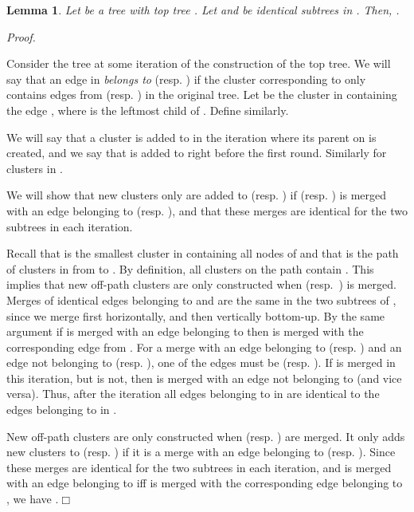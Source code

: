 \documentclass [11pt]{article}
\newtheorem{lemma}{Lemma}
\newcommand{\qed}{\hfill\ensuremath{\Box}\medskip\\\noindent}
\newenvironment{proof}{\noindent\emph{Proof. }}{}
\begin{document}
\begin{lemma}\label{lem:top-tree-ident}
Let  be a tree with top tree . Let  and  be identical subtrees in . Then, . 
\end{lemma}
\begin{proof} 


Consider the tree  at some iteration of the construction of the top tree. We will say that an edge  in  \emph{belongs to}  (resp. ) if the cluster corresponding to  only contains edges from  (resp. ) in the original tree. Let  be the cluster in   containing  the edge , where  is the leftmost child of . Define  similarly.

We will say that a cluster  is added to  in the iteration where its parent on  is created, and we say that  is added to  right before the first round. Similarly for clusters in .

We will show that new clusters only are added to  (resp. )  if  (resp. ) is merged with an edge belonging to  (resp. ), and that these merges are identical for the two subtrees in each iteration. 

Recall that  is the smallest cluster in  containing all nodes of  and that   is the path of clusters in  from  to . By definition, all clusters on the path  contain . This implies that new off-path clusters are only  constructed when  (resp.\ ) is merged. Merges of identical edges belonging to  and  are the same in the two subtrees of , since we merge first horizontally, and then vertically bottom-up.  
By the same argument if  is merged with an edge belonging to  then  is merged with the corresponding edge from .
For a merge with an edge belonging  to   (resp. ) and an edge not belonging to  (resp. ), one of the edges must be  (resp. ). If  is merged in this iteration, but  is not, then  is merged with an edge not belonging to  (and vice versa). 
Thus, after the iteration all edges belonging to  in   are identical to the edges belonging to  in .  

New off-path clusters are only constructed when  (resp. ) are merged. It only adds new clusters to  (resp. ) if it is a merge with an edge belonging to  (resp. ). Since these merges are identical for the two subtrees in each iteration, and  is merged with an edge belonging to  iff   is merged with the corresponding edge belonging to , we have .\qed
\end{proof}
\end{document}
